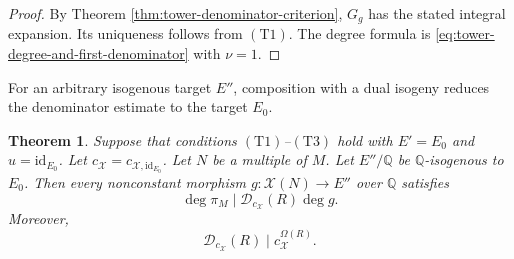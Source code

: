 \documentclass[12pt, letterpaper]{amsart}
\newtheorem{theorem}{Theorem}[section]
\theoremstyle{definition}
\theoremstyle{remark}
\newcommand{\Q}{\mathbb Q}
\numberwithin{equation}{section}
\begin{document}
\begin{proof}
By Theorem \ref{thm:tower-denominator-criterion}, \(G_g\) has the stated
integral expansion. Its uniqueness follows from \hyperlink{tower-condition-T1}{\(\mathrm{(T1)}\)}. The degree formula is
\eqref{eq:tower-degree-and-first-denominator} with \(\nu=1\).
\end{proof}

For an arbitrary isogenous target \(E''\), composition with a dual
isogeny reduces the denominator estimate to the target \(E_0\).

\begin{theorem}\label{thm:tower-optimal-degree}
Suppose that conditions \hyperlink{tower-condition-T1}{\(\mathrm{(T1)}\)}--\hyperlink{tower-condition-T3}{\(\mathrm{(T3)}\)} hold
with \(E'=E_0\) and \(u=\mathrm{id}_{E_0}\). Let
\(c_{\mathcal X}=c_{\mathcal X,\mathrm{id}_{E_0}}\). Let \(N\) be a multiple
of \(M\). Let \(E''/\Q\) be \(\Q\)-isogenous to \(E_0\). Then every nonconstant
morphism \(g:\mathcal X(N)\to E''\) over \(\Q\) satisfies
\begin{equation}\label{eq:tower-optimal-degree}
        \deg\pi_M\mid\mathcal D_{c_{\mathcal X}}(R)\deg g.
\end{equation}
Moreover,
\begin{equation}\label{eq:sharp-divides-omega}
        \mathcal D_{c_{\mathcal X}}(R)
        \mid c_{\mathcal X}^{\Omega(R)}.
\end{equation}
\end{theorem}
\end{document}
